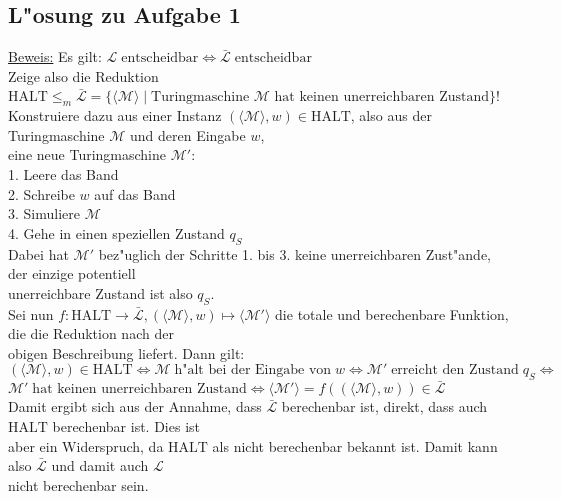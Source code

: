 \documentclass[10pt,oneside,onecolumn,a4paper,german,titlepage]{article}
\begin{document}
\subsection*{L"osung zu Aufgabe 1}
\underline{Beweis:} Es gilt: $\mathcal{L} \; \mbox{entscheidbar} \Leftrightarrow
\bar{\mathcal{L}} \; \mbox{entscheidbar}$\\
Zeige also die Reduktion $\mbox{HALT} \leq_m \bar{\mathcal{L}} = \{\langle\mathcal{M}
\rangle \; | \; \mbox{Turingmaschine $\mathcal{M}$ hat keinen unerreichbaren
Zustand}\}$!\\
Konstruiere dazu aus einer Instanz $(\langle\mathcal{M}\rangle,w) \in \mbox{HALT}$,
also aus der Turingmaschine $\mathcal{M}$ und deren Eingabe $w$,\\
eine neue Turingmaschine $\mathcal{M}'$:\\
1. Leere das Band\\
2. Schreibe $w$ auf das Band\\
3. Simuliere $\mathcal{M}$\\
4. Gehe in einen speziellen Zustand $q_S$\\
Dabei hat $\mathcal{M}'$ bez"uglich der Schritte 1. bis 3. keine unerreichbaren
Zust"ande, der einzige potentiell\\
unerreichbare Zustand ist also $q_S$.\\[4pt]
Sei nun $f: \mbox{HALT} \to \bar{\mathcal{L}}, (\langle\mathcal{M}\rangle,w) \mapsto
\langle\mathcal{M}'\rangle$ die totale und berechenbare Funktion, die die Reduktion
nach der\\
obigen Beschreibung liefert. Dann gilt:\\[4pt]
$(\langle\mathcal{M}\rangle,w) \in \mbox{HALT} \Leftrightarrow \mathcal{M} \;
\mbox{h"alt bei der Eingabe von} \; w \Leftrightarrow \mathcal{M}' \;
\mbox{erreicht den Zustand} \; q_S \Leftrightarrow$\\
$\mathcal{M}' \; \mbox{hat keinen unerreichbaren Zustand} \Leftrightarrow \langle
\mathcal{M}'\rangle = f((\langle\mathcal{M}\rangle,w)) \in \bar{\mathcal{L}}$\\[4pt]
Damit ergibt sich aus der Annahme, dass $\bar{\mathcal{L}}$ berechenbar ist, direkt,
dass auch $\mbox{HALT}$ berechenbar ist. Dies ist\\
aber ein Widerspruch, da $\mbox{HALT}$ als nicht berechenbar bekannt ist. Damit
kann also $\bar{\mathcal{L}}$ und damit auch $\mathcal{L}$\\
nicht berechenbar sein.

\newpage
\end{document}
